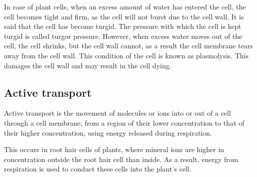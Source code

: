 In case of plant cells, when an excess amount of water has entered the cell, the cell becomes 
tight and firm, as the cell will not burst due to the cell wall. It is said that the cell has become
turgid. The pressure with which the cell is kept turgid is called turgor pressure. However, when
excess water moves out of the cell, the cell shrinks, but the cell wall cannot, as a result the
cell membrane tears away from the cell wall. This condition of the cell is known as plasmolysis.
This damages the cell wall and may result in the cell dying.

\subsection{Active transport}
Active transport is the movement of molecules or ions into or out of a cell through a cell
membrane, from a region of their lower concentration to that of their higher concentration, using
energy released during respiration.

This occurs in root hair cells of plants, where mineral ions are higher in concentration outside
the root hair cell than inside. As a result, energy from respiration is used to conduct these cells
into the plant's cell.
